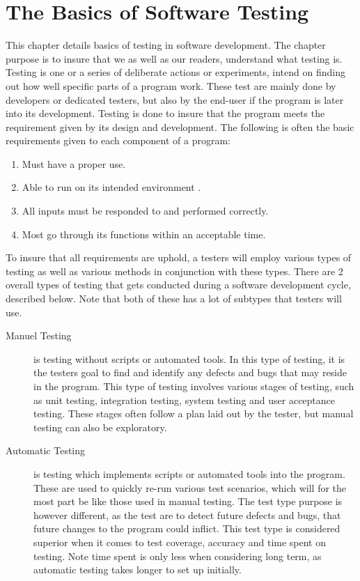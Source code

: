 \section{The Basics of Software Testing}
This chapter details basics of testing in software development. The chapter purpose is to insure that we as well as our readers, understand what testing is.
Testing is one or a series of deliberate actions or experiments, intend on finding out how well specific parts of a program work. These test are mainly done by developers or dedicated testers, but also by the end-user if the program is later into its development. 
Testing is done to insure that the program meets the requirement given by its design and development. The following is often the basic requirements given to each component of a program:
\begin{enumerate}
	\item Must have a proper use.
	\item Able to run on its intended environment .
	\item All inputs must be responded to and performed correctly. 
	\item Most go through its functions within an acceptable time.
\end{enumerate}
To insure that all requirements are uphold, a testers will employ various types of testing as well as various methods in conjunction with these types.
There are 2 overall types of testing that gets conducted during a software development cycle\cite{BasicTesting1}, described below. Note that both of these has a lot of subtypes that testers will use.
\begin{description}
\item [Manuel Testing] is testing without scripts or automated tools. In this type of testing, it is the testers goal to find and identify any defects and bugs that may reside in the program. This type of testing involves various stages of testing, such as unit testing, integration testing, system testing and user acceptance testing. These stages often follow a plan laid out by the tester, but manual testing can also be exploratory.  
\item [Automatic Testing] is testing which implements scripts or automated tools into the program. These are used to quickly re-run various test scenarios, which will for the most part be like those used in manual testing. The test type purpose is however different, as the test are to detect future defects and bugs, that future changes to the program could inflict. This test type is considered superior when it comes to test coverage, accuracy and time spent on testing. Note time spent is only less when considering long term, as automatic testing takes longer to set up initially.
\end{description}
